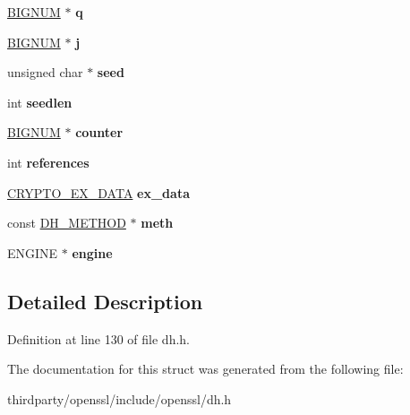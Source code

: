 \begin{DoxyCompactItemize}
\mbox{\label{structdh__st_a6bbb03a3acdbab173e1b4f74bf53d581}} 
\hyperlink{structbignum__st}{B\+I\+G\+N\+UM} $\ast$ {\bfseries q}
\item 
\mbox{\label{structdh__st_af6140cb07291cd40b23442d1466ec114}} 
\hyperlink{structbignum__st}{B\+I\+G\+N\+UM} $\ast$ {\bfseries j}
\item 
\mbox{\label{structdh__st_ae0d5af379d1113d5d2c402f9d2d85d49}} 
unsigned char $\ast$ {\bfseries seed}
\item 
\mbox{\label{structdh__st_a07d3bf5a4dcd263d27d42c92c74d42ef}} 
int {\bfseries seedlen}
\item 
\mbox{\label{structdh__st_a68f2d92b8bc2abd3f0f1d31b061eaf07}} 
\hyperlink{structbignum__st}{B\+I\+G\+N\+UM} $\ast$ {\bfseries counter}
\item 
\mbox{\label{structdh__st_a12e77dc7593509a21bf3362b97f472b7}} 
int {\bfseries references}
\item 
\mbox{\label{structdh__st_a82bd75ac9a0b1c3a698c28a87e56a78f}} 
\hyperlink{structcrypto__ex__data__st}{C\+R\+Y\+P\+T\+O\+\_\+\+E\+X\+\_\+\+D\+A\+TA} {\bfseries ex\+\_\+data}
\item 
\mbox{\label{structdh__st_ae98dc2f23940781bceeb2b4cb931a2a3}} 
const \hyperlink{structdh__method}{D\+H\+\_\+\+M\+E\+T\+H\+OD} $\ast$ {\bfseries meth}
\item 
\mbox{\label{structdh__st_ab4369fbdcf15e3937755fd06420bd5b5}} 
E\+N\+G\+I\+NE $\ast$ {\bfseries engine}
\end{DoxyCompactItemize}


\subsection{Detailed Description}


Definition at line 130 of file dh.\+h.



The documentation for this struct was generated from the following file\+:\begin{DoxyCompactItemize}
\item 
thirdparty/openssl/include/openssl/dh.\+h\end{DoxyCompactItemize}
